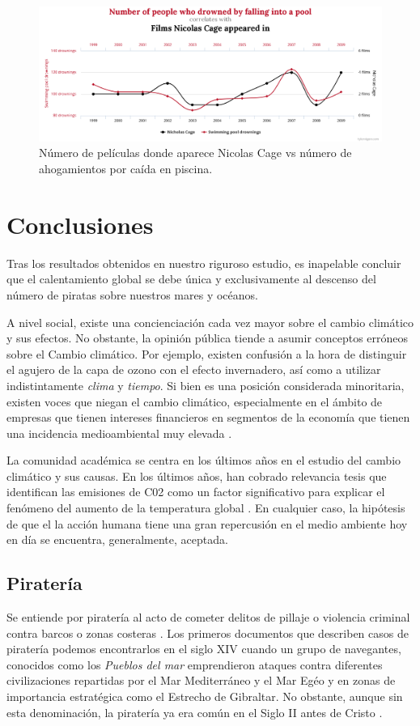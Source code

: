 \documentclass{article}
\begin{document}
\begin{figure}
  \includegraphics[width=\linewidth]{graph_2.png}
  \caption{Número de películas donde aparece Nicolas Cage vs número de ahogamientos por caída en piscina.}
  \label{fig:grafico_2}
\end{figure}




\section{Conclusiones}

Tras los resultados obtenidos en nuestro riguroso estudio, es inapelable concluir que el calentamiento global se debe única y exclusivamente al descenso del número de piratas sobre nuestros mares y océanos.

A nivel social, existe una concienciación cada vez mayor sobre el cambio climático y sus efectos. No obstante, la opinión pública tiende a asumir conceptos erróneos sobre el Cambio climático. Por ejemplo, existen confusión a la hora de distinguir el agujero de la capa de ozono con el efecto invernadero, así como a utilizar indistintamente \emph{clima} y \emph{tiempo}\cite{bostrom}. Si bien es una posición considerada minoritaria, existen voces que niegan el cambio climático, especialmente en el ámbito de empresas que tienen intereses financieros en segmentos de la economía que tienen una incidencia medioambiental muy elevada \cite{astroturf}.

La comunidad académica se centra en los últimos años en el estudio del cambio climático y sus causas. En los últimos años, han cobrado relevancia tesis que identifican las emisiones de C02 como un factor significativo para explicar el fenómeno del aumento de la temperatura global \cite{whitmarsh2011}. En cualquier caso, la hipótesis de que el la acción humana tiene una gran repercusión en el medio ambiente hoy en día se encuentra, generalmente, aceptada.

\subsection{Piratería}
Se entiende por piratería al acto de cometer delitos de pillaje o violencia criminal contra barcos o zonas costeras \cite{pennell_2001}. Los primeros documentos que describen casos de piratería podemos encontrarlos en el siglo XIV cuando un grupo de navegantes, conocidos como los \emph{Pueblos del mar} emprendieron ataques contra diferentes civilizaciones repartidas por el Mar Mediterráneo y el Mar Egéo y en zonas de importancia estratégica como el Estrecho de Gibraltar. No obstante, aunque sin esta denominación, la piratería ya era común en el Siglo II antes de Cristo \cite{lane2015}.
\end{document}

